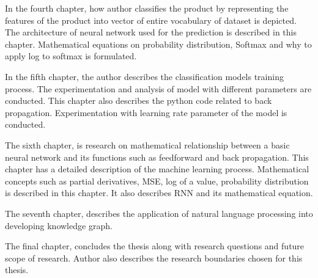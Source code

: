 In the fourth chapter, how author classifies the product by representing the features of the product into vector of entire vocabulary of dataset is depicted. The architecture of neural network used for the prediction is described in this chapter. Mathematical equations on probability distribution, Softmax and why to apply log to softmax is formulated. 

In the fifth chapter, the author describes the classification models training process. The experimentation and analysis of model with different parameters are conducted. This chapter also describes the python code related to back propagation. Experimentation with learning rate parameter of the model is conducted.

The sixth chapter, is research on mathematical relationship between a basic neural network and its functions such as feedforward and back propagation. This chapter has a detailed description of the machine learning process. Mathematical concepts such as partial derivatives, \acl{MSE}, log of a value, probability distribution is described in this chapter. It also describes \acl{RNN} and its mathematical equation.  

The seventh chapter, describes the application of natural language processing into developing knowledge graph.

The final chapter, concludes the thesis along with research questions and future scope of research. Author also describes the research boundaries chosen for this thesis.  
